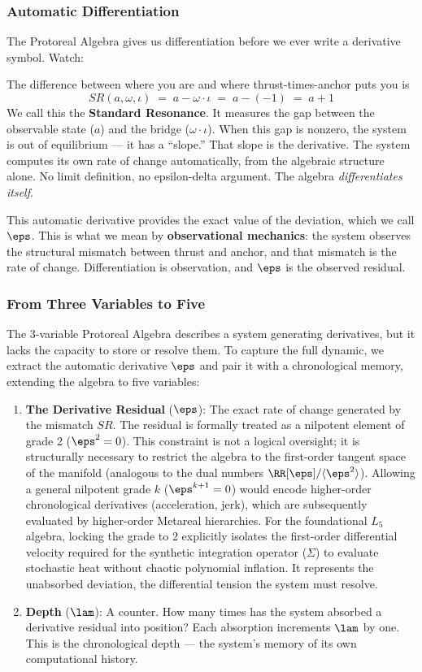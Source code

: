 \subsubsection*{Automatic Differentiation}

The Protoreal Algebra gives us differentiation before we ever write a derivative symbol. Watch:

The difference between where you are and where thrust-times-anchor puts you is
$$SR(a, \omega, \iota) \;=\; a - \omega \cdot \iota \;=\; a - (-1) \;=\; a + 1$$
We call this the \textbf{Standard Resonance}. It measures the gap between the observable state ($a$) and the bridge ($\omega \cdot \iota$). When this gap is nonzero, the system is out of equilibrium --- it has a ``slope.'' That slope is the derivative. The system computes its own rate of change automatically, from the algebraic structure alone. No limit definition, no epsilon-delta argument. The algebra \emph{differentiates itself}.

This automatic derivative provides the exact value of the deviation, which we call $\eps$. This is what we mean by \textbf{observational mechanics}: the system observes the structural mismatch between thrust and anchor, and that mismatch is the rate of change. Differentiation is observation, and $\eps$ is the observed residual.

\subsubsection*{From Three Variables to Five}

The 3-variable Protoreal Algebra describes a system generating derivatives, but it lacks the capacity to store or resolve them. To capture the full dynamic, we extract the automatic derivative $\eps$ and pair it with a chronological memory, extending the algebra to five variables:

\begin{enumerate}
\item \textbf{The Derivative Residual} ($\eps$): The exact rate of change generated by the mismatch $SR$. The residual is formally treated as a nilpotent element of grade 2 ($\eps^2 = 0$). This constraint is not a logical oversight; it is structurally necessary to restrict the algebra to the first-order tangent space of the manifold (analogous to the dual numbers $\RR[\eps]/\langle\eps^2\rangle$). Allowing a general nilpotent grade $k$ ($\eps^{k+1} = 0$) would encode higher-order chronological derivatives (acceleration, jerk), which are subsequently evaluated by higher-order Metareal hierarchies. For the foundational $L_5$ algebra, locking the grade to 2 explicitly isolates the first-order differential velocity required for the synthetic integration operator ($\Sigma$) to evaluate stochastic heat without chaotic polynomial inflation. It represents the unabsorbed deviation, the differential tension the system must resolve. 
\item \textbf{Depth} ($\lam$): A counter. How many times has the system absorbed a derivative residual into position? Each absorption increments $\lam$ by one. This is the chronological depth --- the system's memory of its own computational history.
\end{enumerate}

